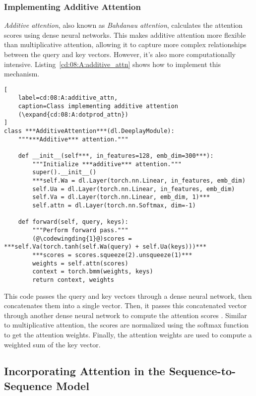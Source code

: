 \subsubsection{Implementing Additive Attention}

\emph{Additive attention}, also known as \emph{Bahdanau attention},
calculates the attention scores using dense neural networks. This makes additive attention more flexible than multiplicative attention, allowing it to capture more complex relationships between the query and key vectors. However, it's also more computationally intensive. Listing~\ref{cd:08:A:additive_attn} shows how to implement this mechanism.
\begin{lstlisting}[
    label=cd:08:A:additive_attn,
    caption=Class implementing additive attention
    (\expand{cd:08:A:dotprod_attn})
]
class ***AdditiveAttention***(dl.DeeplayModule):
    """***Additive*** attention."""

    def __init__(self***, in_features=128, emb_dim=300***):
        """Initialize ***additive*** attention."""
        super().__init__()
        ***self.Wa = dl.Layer(torch.nn.Linear, in_features, emb_dim)
        self.Ua = dl.Layer(torch.nn.Linear, in_features, emb_dim)
        self.Va = dl.Layer(torch.nn.Linear, emb_dim, 1)***
        self.attn = dl.Layer(torch.nn.Softmax, dim=-1)

    def forward(self, query, keys):
        """Perform forward pass."""
        (@\codewingding{1}@)scores = ***self.Va(torch.tanh(self.Wa(query) + self.Ua(keys)))***
        ***scores = scores.squeeze(2).unsqueeze(1)***
        weights = self.attn(scores)
        context = torch.bmm(weights, keys)
        return context, weights
\end{lstlisting}
This code passes the query and key vectors through a dense neural network, then concatenates them into a single vector. Then, it passes this concatenated vector through another dense neural network to compute the attention scores . Similar to multiplicative attention, the scores are  normalized using the softmax function to get the attention weights. Finally, the attention weights are used to compute a weighted sum of the key vector.

\subsection{Incorporating Attention in the Sequence-to-Sequence Model}

